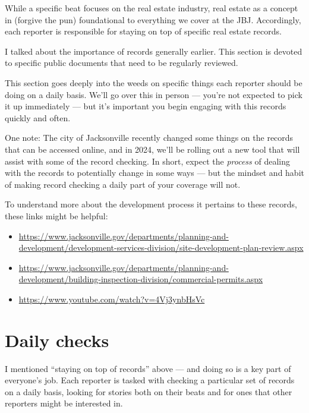 \documentclass[
  11pt,
  american,
  letterpaperpaper,
  extrafontsizes,onecolumn,openright
  ]{memoir}
\providecommand{\tightlist}{%
  \setlength{\itemsep}{0pt}\setlength{\parskip}{0pt}}
\begin{document}
While a specific beat focuses on the real estate industry, real estate as a concept in (forgive the pun) foundational to everything we cover at the JBJ. Accordingly, each reporter is responsible for staying on top of specific real estate records.

I talked about the importance of records generally earlier. This section is devoted to specific public documents that need to be regularly reviewed.

\leavevmode{}%
\begin{greybox}[frametitle=Onboarding Path]
This section goes deeply into the weeds on specific things each reporter should be doing on a daily basis. We'll go over this in person --- you're not expected to pick it up immediately --- but it's important you begin engaging with this records quickly and often.

\end{greybox}

One note: The city of Jacksonville recently changed some things on the records that can be accessed online, and in 2024, we'll be rolling out a new tool that will assist with some of the record checking. In short, expect the \emph{process} of dealing with the records to potentially change in some ways --- but the mindset and habit of making record checking a daily part of your coverage will not.

To understand more about the development process it pertains to these records, these links might be helpful:

\begin{itemize}
\tightlist
\item
  \url{https://www.jacksonville.gov/departments/planning-and-development/development-services-division/site-development-plan-review.aspx}
\item
  \url{https://www.jacksonville.gov/departments/planning-and-development/building-inspection-division/commercial-permits.aspx}
\item
  \url{https://www.youtube.com/watch?v=4Vj3ynbHsVc}
\end{itemize}

\hypertarget{daily-checks}{%
\section*{Daily checks}\label{daily-checks}}

I mentioned \enquote{staying on top of records} above --- and doing so is a key part of everyone's job. Each reporter is tasked with checking a particular set of records on a daily basis, looking for stories both on their beats and for ones that other reporters might be interested in.
\end{document}
